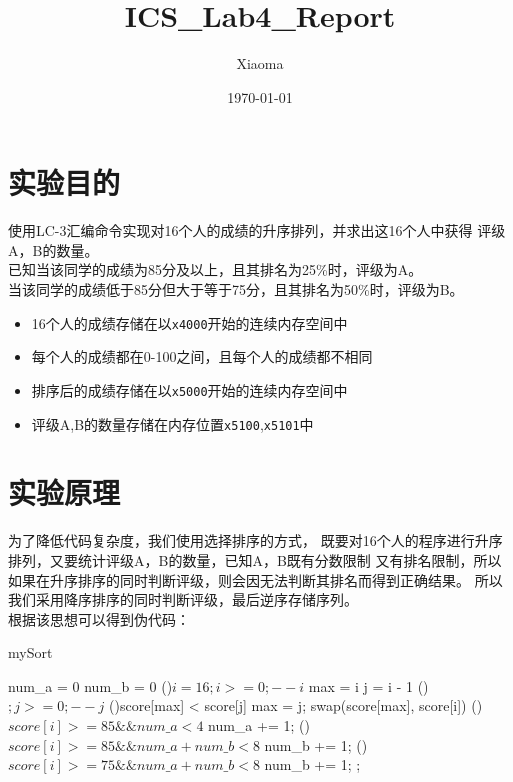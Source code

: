 \documentclass[12pt, a4paper, oneside]{ctexart}
\title{ICS\_Lab4\_Report}
\author{Xiaoma}
\date{\today}
\begin{document}
\maketitle
\section*{实验目的}
使用LC-3汇编命令实现对16个人的成绩的升序排列，并求出这16个人中获得
评级A，B的数量。\\
已知当该同学的成绩为85分及以上，且其排名为25\%时，评级为A。\\
当该同学的成绩低于85分但大于等于75分，且其排名为50\%时，评级为B。
\begin{itemize}
    \item 16个人的成绩存储在以\verb|x4000|开始的连续内存空间中
    \item 每个人的成绩都在0-100之间，且每个人的成绩都不相同
    \item 排序后的成绩存储在以\verb|x5000|开始的连续内存空间中
    \item 评级A,B的数量存储在内存位置\verb|x5100|,\verb|x5101|中
\end{itemize}

\section*{实验原理}
为了降低代码复杂度，我们使用选择排序的方式，
既要对16个人的程序进行升序排列，又要统计评级A，B的数量，已知A，B既有分数限制
又有排名限制，所以如果在升序排序的同时判断评级，则会因无法判断其排名而得到正确结果。
所以我们采用降序排序的同时判断评级，最后逆序存储序列。\\
根据该思想可以得到伪代码：
\begin{algorithm*}
    \caption{mySort}
    \label{alg:algorithm}
    \BlankLine
    num\_a = 0\;
    num\_b = 0\;
    \For(){$i = 16; i >= 0; --i$}{
        max = i\;
        j = i - 1\;
        \For(){$;j >= 0; --j$}{
            \If(){score[max] < score[j]}{
                max = j;
            }
        }
        swap(score[max], score[i])\;
        \If(){$score[i] >= 85 \& \& num\_a < 4$}{
            num\_a += 1;
        }
        \ElseIf(){$score[i] >= 85 \& \& num\_a + num\_b < 8$}{
            num\_b += 1;
        }
        \ElseIf(){$score[i] >= 75 \& \& num\_a + num\_b < 8$}{
            num\_b += 1;
        }
    }
    ;
\end{algorithm*}
\end{document}
